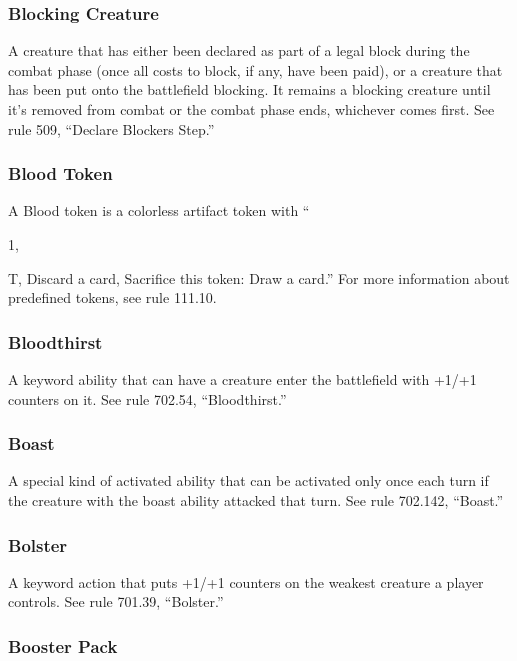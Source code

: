 {\subsubsection*{Blocking Creature}

A creature that has either been declared as part of a legal block during the combat phase (once all costs to block, if any, have been paid), or a creature that has been put onto the battlefield blocking. It remains a blocking creature until it’s removed from combat or the combat phase ends, whichever comes first. See rule 509, “Declare Blockers Step.”

\subsubsection*{Blood Token}

A Blood token is a colorless artifact token with “{1, {T, Discard a card, Sacrifice this token: Draw a card.” For more information about predefined tokens, see rule 111.10.

\subsubsection*{Bloodthirst}

A keyword ability that can have a creature enter the battlefield with +1/+1 counters on it. See rule 702.54, “Bloodthirst.”

\subsubsection*{Boast}

A special kind of activated ability that can be activated only once each turn if the creature with the boast ability attacked that turn. See rule 702.142, “Boast.”

\subsubsection*{Bolster}

A keyword action that puts +1/+1 counters on the weakest creature a player controls. See rule 701.39, “Bolster.”

\subsubsection*{Booster Pack}

}}}
